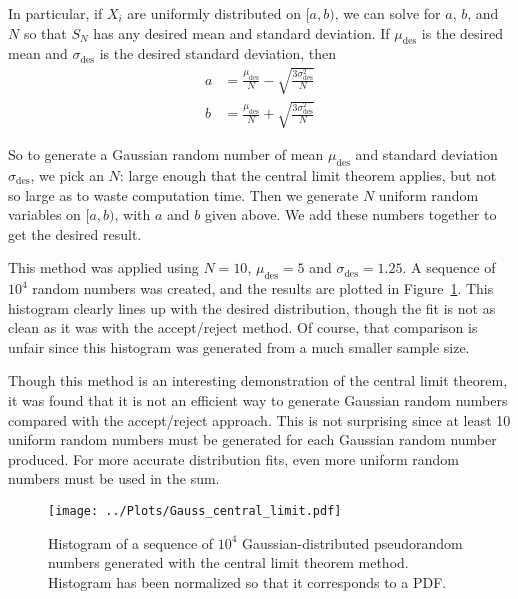 \documentclass[twocolumn]{myarticle}
\begin{document}
In particular, if $ X_i $ are uniformly distributed on $ [a,b) $, we can solve for $ a $, $ b $, and $ N $ so that $ S_N $ has any desired mean and standard deviation.
If $ \mu_\text{des} $ is the desired mean and $ \sigma_\text{des} $ is the desired standard deviation, then
\begin{align}
    a &= \frac{\mu_\text{des}}{N} - \sqrt{\frac{3\sigma^2_\text{des}}{N}}
    \\
    b &= \frac{\mu_\text{des}}{N} + \sqrt{\frac{3\sigma^2_\text{des}}{N}}
\end{align}

So to generate a Gaussian random number of mean $ \mu_\text{des} $ and standard deviation $ \sigma_\text{des} $, we pick an $ N $: large enough that the central limit theorem applies, but not so large as to waste computation time. 
Then we generate $ N $ uniform random variables on $ [a, b) $, with $ a $ and $ b $ given above.
We add these numbers together to get the desired result.

This method was applied using $ N = 10 $, $ \mu_\text{des} = 5 $ and $ \sigma_\text{des} = 1.25 $.
A sequence of $ 10^4 $ random numbers was created, and the results are plotted in Figure~\ref{fig:gauss_central_limit}.
This histogram clearly lines up with the desired distribution, though the fit is not as clean as it was with the accept/reject method.
Of course, that comparison is unfair since this histogram was generated from a much smaller sample size.

Though this method is an interesting demonstration of the central limit theorem, it was found that it is not an efficient way to generate Gaussian random numbers compared with the accept/reject approach.
This is not surprising since at least 10 uniform random numbers must be generated for each Gaussian random number produced.
For more accurate distribution fits, even more uniform random numbers must be used in the sum.

\begin{figure}[ht!]
    \begin{center}
    \texttt{[image: ../Plots/Gauss\_central\_limit.pdf]}
    \caption{%
        Histogram of a sequence of $ 10^4 $ Gaussian-distributed pseudorandom numbers generated with the central limit theorem method.
        Histogram has been normalized so that it corresponds to a PDF.
    }
    \label{fig:gauss_central_limit}
    \end{center}
\end{figure}
\end{document}
